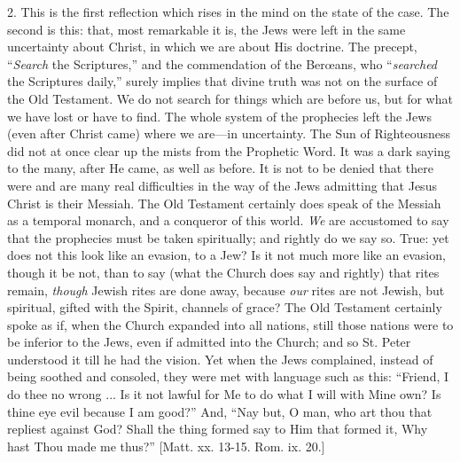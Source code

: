 2. This is the first reflection which rises in the mind on the
state of the case. The second is this: that, most remarkable it is,
the Jews were left in the same uncertainty about Christ, in which we
are about His doctrine. The precept, ``\emph{Search} the
Scriptures,'' and the commendation of the Berœans, who ``\emph{searched}
the Scriptures daily,'' surely implies that divine truth was not
on the surface of the Old Testament. We do not search for things which
are before us, but for what we have lost or have to find. The whole
system of the prophecies left the Jews (even after Christ came) where
we are—in uncertainty. The Sun of Righteousness did not at once
clear up the mists from the Prophetic Word. It was a dark saying to
the many, after He came, as well as before. It is not to be
denied that there were and are many real difficulties in the way of
the Jews admitting that Jesus Christ is their Messiah. The Old
Testament certainly does speak of the Messiah as a temporal monarch,
and a conqueror of this world. \emph{We} are accustomed to say that
the prophecies must be taken spiritually; and rightly do we say so.
True: yet does not this look like an evasion, to a Jew? Is it not much
more like an evasion, though it be not, than to say (what the Church
does say and rightly) that rites remain, \emph{though} Jewish rites
are done away, because \emph{our} rites are not Jewish, but spiritual,
gifted with the Spirit, channels of grace? The Old Testament certainly
spoke as if, when the Church expanded into all nations, still those
nations were to be inferior to the Jews, even if admitted into the
Church; and so St. Peter understood it till he had the vision. Yet
when the Jews complained, instead of being soothed and consoled, they
were met with language such as this: ``Friend, I do thee no wrong
... Is it not lawful for Me to do what I will with Mine own? Is thine
eye evil because I am good?'' And, ``Nay but, O man, who art
thou that repliest against God? Shall the thing formed say to Him that
formed it, Why hast Thou made me thus?'' [Matt. xx. 13-15. Rom.
ix. 20.]

